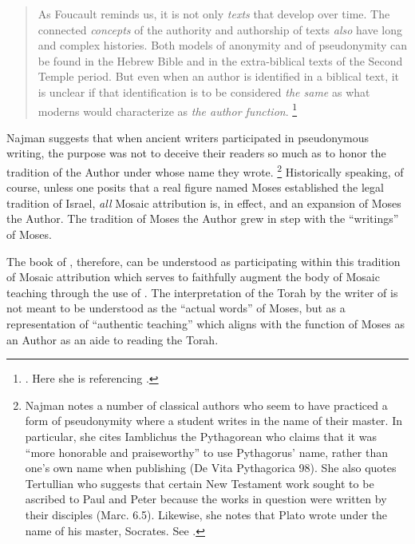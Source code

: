 \begin{quote}
    As Foucault reminds us, it is not only \emph{texts} that develop over time. The connected \emph{concepts} of the authority and authorship of texts \emph{also} have long and complex histories. Both models of anonymity and of pseudonymity can be found in the Hebrew Bible and in the extra-biblical texts of the Second Temple period. But even when an author is identified in a biblical text, it is unclear if that identification is to be considered \emph{the same} as what moderns would characterize as \emph{the author function}.%
        \footnote{%
            \cite[9--10]{najman2003}. Here she is referencing
            \cite[213]{foucault_essential-foucault_2}.}
\end{quote}
\noindent
Najman suggests that when ancient writers participated in pseudonymous writing, the purpose was not to deceive their readers so much as to honor the tradition of the Author under whose name they wrote.%
    \footnote{Najman notes a number of classical authors who seem to have practiced a form of pseudonymity where a student writes in the name of their master. In particular, she cites Iamblichus the Pythagorean who claims that it was ``more honorable and praiseworthy'' to use Pythagorus' name, rather than one's own name when publishing (De Vita Pythagorica 98). She also quotes Tertullian who suggests that certain New Testament work sought to be ascribed to Paul and Peter because the works in question were written by their disciples (Marc. 6.5). Likewise, she notes that Plato wrote under the name of his master, Socrates. See \cite[13]{najman2003}.}
Historically speaking, of course, unless one posits that a real figure named Moses established the legal tradition of Israel, \emph{all} Mosaic attribution is, in effect, \psgraphical and an expansion of Moses the Author. The tradition of Moses the Author grew in step with the ``writings'' of Moses.

The book of \jub, therefore, can be understood as participating within this tradition of Mosaic attribution which serves to faithfully augment the body of Mosaic teaching through the use of \psy. The interpretation of the Torah by the writer of \jub is not meant to be understood as the ``actual words'' of Moses, but as a representation of ``authentic teaching'' which aligns with the function of Moses as an Author as an aide to reading the Torah.\autocite[13]{najman2003}


